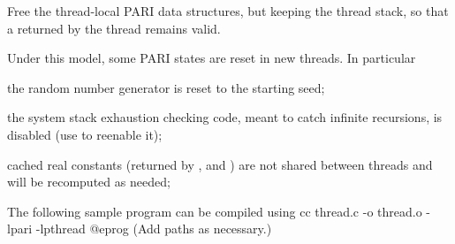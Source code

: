 Free the thread-local PARI data structures, but keeping the thread stack, so
that a  returned by the thread remains valid.

\noindent Under this model, some PARI states are reset in new threads. In
particular

\item the random number generator is reset to the starting seed;

\item the system stack exhaustion checking code, meant to catch infinite
recursions, is disabled (use  to reenable it);

\item cached real constants (returned by ,  and
) are not shared between threads and will be recomputed as
needed;

\noindent The following sample program can be compiled using
\bprog
    cc thread.c -o thread.o -lpari -lpthread
@eprog\noindent
(Add  paths as necessary.)

\noindent{}

\vfill\eject
